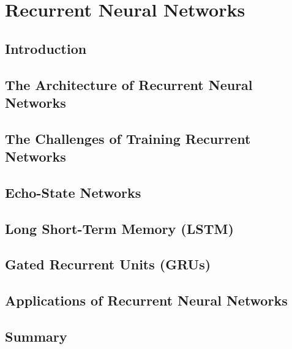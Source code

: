 \documentclass[a4paper]{article}
\begin{document}
\newpage
\section{Recurrent Neural Networks}
\subsection{Introduction}

\subsection{The Architecture of Recurrent Neural Networks}

\subsection{The Challenges of Training Recurrent Networks}

\subsection{Echo-State Networks}

\subsection{Long Short-Term Memory (LSTM)}

\subsection{Gated Recurrent Units (GRUs)}

\subsection{Applications of Recurrent Neural Networks}

\subsection{Summary}
\end{document}
